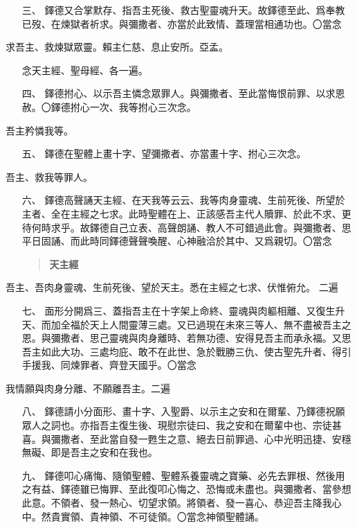 \begin{enumerate}
    \item[三、]{\small 鐸德又合掌默存、指吾主死後、救古聖靈魂升天。故鐸德至此、爲奉教已歿、在煉獄者祈求。與彌撒者、亦當於此致情、蓋理當相通功也。〇當念}
\end{enumerate}
求吾主、救煉獄眾靈。賴主仁慈、息止安所。{\cspace}亞孟。
\begin{enumerate}
    \item[]{\small 念天主經、聖母經、各一遍。}
    \item[四、]{\small 鐸德拊心、以示吾主憐念眾罪人。與彌撒者、至此當悔恨前罪、以求恩赦。〇鐸德拊心一次、我等拊心三次念。}
\end{enumerate} 
吾主矜憐我等。
\begin{enumerate}
    \item[五、]{\small 鐸德在聖體上畫十字、望彌撒者、亦當畫十字、拊心三次念。}
\end{enumerate} 
吾主、救我等罪人。
\begin{enumerate}
    \item[六、]{\small 鐸德高聲誦天主經、在天我等云云、我等肉身靈魂、生前死後、所望於主者、全在主經之七求。此時聖體在上、正該感吾主代人贖罪、於此不求、更待何時求乎。故鐸德自己立表、高聲朗誦、教人不可錯過此會。與彌撒者、思平日固誦、而此時同鐸德聲聲喚醒、心神融洽於其中、又爲親切。〇當念}
    \begin{quote}
        \bfseries 天主經
    \end{quote}
\end{enumerate} 
吾主、吾肉身靈魂、生前死後、望於天主。悉在主經之七求、伏惟俯允。 {\small 二遍}
\begin{enumerate}
    \item[七、]{\small 面形分開爲三、蓋指吾主在十字架上命終、靈魂與肉軀相離、又復生升天、而加全福於天上人間靈薄三處。又已過現在未來三等人、無不盡被吾主之恩。與彌撒者、思己靈魂與肉身離時、若無功德、安得見吾主而承永福。又思吾主如此大功、三處均庇、敢不在此世、急於戰勝三仇、使古聖先升者、得引手援我、同煉罪者、齊登天國乎。〇當念}
\end{enumerate} 
我情願與肉身分離、不願離吾主。{\small 二遍}
\begin{enumerate}
    \item[八、]{\small 鐸德請小分面形、畫十字、入聖爵、以示主之安和在爾輩、乃鐸德祝願眾人之詞也。亦指吾主復生後、現慰宗徒曰、我之安和在爾輩中也、宗徒甚喜。與彌撒者、至此當自發一甦生之意、絕去日前罪過、心中光明迅捷、安穩無礙、即是吾主之安和在我也。}
    \item[九、]{\small 鐸德叩心痛悔、隨領聖體、聖體系養靈魂之寶藥、必先去罪根、然後用之有益、鐸德雖已悔罪、至此復叩心悔之、恐悔或未盡也。與彌撒者、當參想此意。不領者、發一熱心、切望求領。將領者、發一喜心、恭迎吾主降我心中。然貴實領、貴神領、不可徒領。〇當念神領聖體誦。}
\end{enumerate} 
